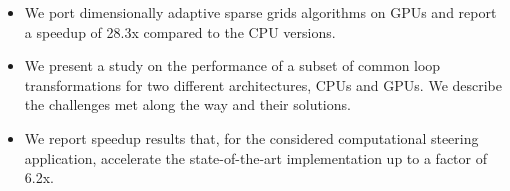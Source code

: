 \begin{itemize}
  \item We port dimensionally adaptive sparse grids algorithms on GPUs and
  report a speedup of 28.3x compared to the CPU versions.
  \item We present a study on the performance of a subset of common loop
  transformations for two different architectures, CPUs and GPUs. We describe
  the challenges met along the way and their solutions.
  \item We report speedup results that, for the considered computational
  steering application, accelerate the state-of-the-art implementation up to a
  factor of 6.2x.
\end{itemize}


